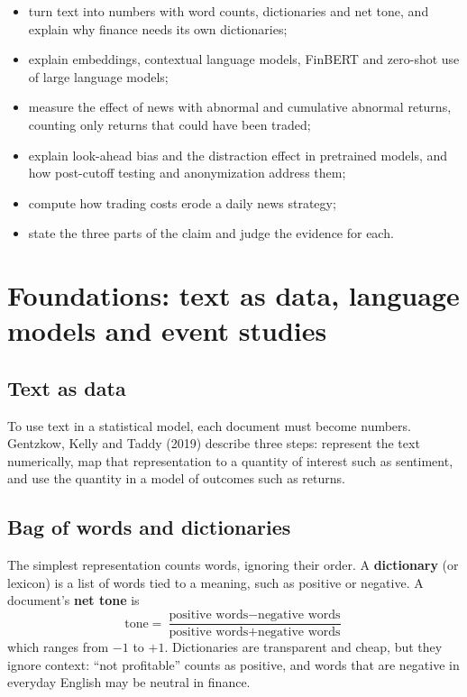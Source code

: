 \begin{itemize}
  \item turn text into numbers with word counts, dictionaries and net tone, and explain why finance needs its own dictionaries;
  \item explain embeddings, contextual language models, FinBERT and zero-shot use of large language models;
  \item measure the effect of news with abnormal and cumulative abnormal returns, counting only returns that could have been traded;
  \item explain look-ahead bias and the distraction effect in pretrained models, and how post-cutoff testing and anonymization address them;
  \item compute how trading costs erode a daily news strategy;
  \item state the three parts of the claim and judge the evidence for each.
\end{itemize}

\section{Foundations: text as data, language models and event studies}
\label{sec:23-foundations}

\subsection{Text as data}

To use text in a statistical model, each document must become numbers. Gentzkow, Kelly and Taddy (2019) describe three steps: represent the text numerically, map that representation to a quantity of interest such as sentiment, and use the quantity in a model of outcomes such as returns.

\subsection{Bag of words and dictionaries}

The simplest representation counts words, ignoring their order. A \textbf{dictionary} (or lexicon) is a list of words tied to a meaning, such as positive or negative. A document's \textbf{net tone} is
\begin{equation}
  \text{tone} = \frac{\text{positive words} - \text{negative words}}{\text{positive words} + \text{negative words}}
  \label{eq:23-tone}
\end{equation}
which ranges from $-1$ to $+1$. Dictionaries are transparent and cheap, but they ignore context: ``not profitable'' counts as positive, and words that are negative in everyday English may be neutral in finance.

